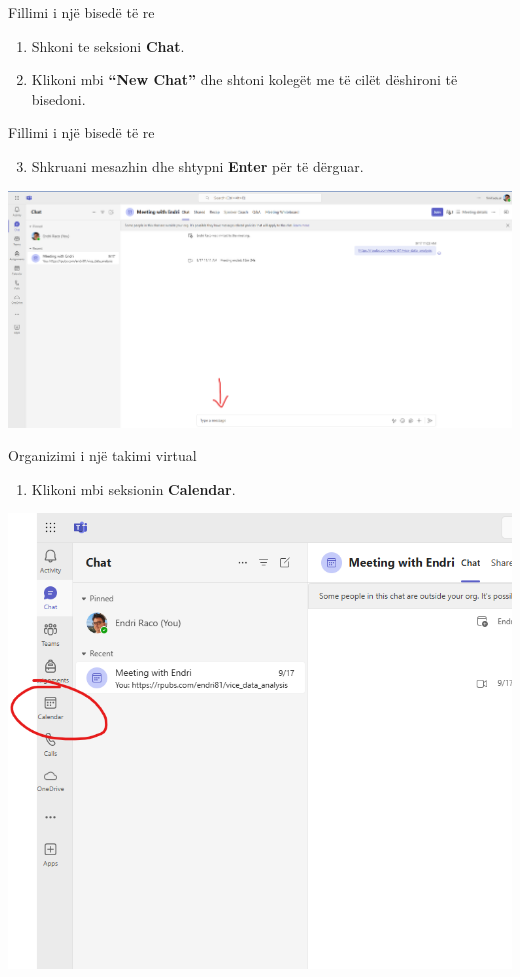 \documentclass[
  ignorenonframetext,
]{beamer}
\providecommand{\tightlist}{%
  \setlength{\itemsep}{0pt}\setlength{\parskip}{0pt}}
\begin{document}
\begin{frame}{Fillimi i një bisedë të re}
\label{fillimi-i-njuxeb-biseduxeb-tuxeb-re}
\begin{enumerate}
\item
  Shkoni te seksioni \textbf{Chat}.
\item
  Klikoni mbi \textbf{``New Chat''} dhe shtoni kolegët me të cilët
  dëshironi të bisedoni.
\end{enumerate}
\end{frame}

\begin{frame}{Fillimi i një bisedë të re}
\label{fillimi-i-njuxeb-biseduxeb-tuxeb-re-1}
\begin{enumerate}
\setcounter{enumi}{2}
\tightlist
\item
  Shkruani mesazhin dhe shtypni \textbf{Enter} për të dërguar.
\end{enumerate}

\includegraphics{./images/teams3.png}
\end{frame}

\begin{frame}{Organizimi i një takimi virtual}
\label{organizimi-i-njuxeb-takimi-virtual}
\begin{enumerate}
\tightlist
\item
  Klikoni mbi seksionin \textbf{Calendar}.
\end{enumerate}

\includegraphics{./images/teams4.png}
\end{frame}
\end{document}
